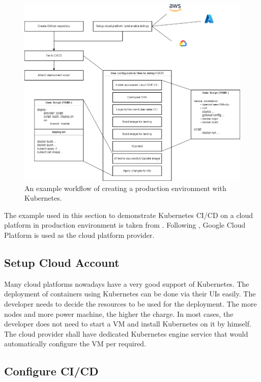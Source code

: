 \begin{figure}[htbp]
	\centering
	\includegraphics[width=350pt]{chapters/part-3/figures/prodenvworkflow.png}
	\caption{An example workflow of creating a production environment with Kubernetes.} \label{ch:vac:fig:prodenvworkflow}
\end{figure}

The example used in this section to demonstrate Kubernetes CI/CD on a cloud platform in production environment is taken from \cite{stephen2023docker}. Following \cite{stephen2023docker}, Google Cloud Platform is used as the cloud platform provider.

\subsection{Setup Cloud Account}

Many cloud platforms nowadays have a very good support of Kubernetes. The deployment of containers using Kubernetes can be done via their UIs easily. The developer needs to decide the resources to be used for the deployment. The more nodes and more power machine, the higher the charge. In most cases, the developer does not need to start a VM and install Kubernetes on it by himself. The cloud provider shall have dedicated Kubernetes engine service that would automatically configure the VM per required.

\subsection{Configure CI/CD}


